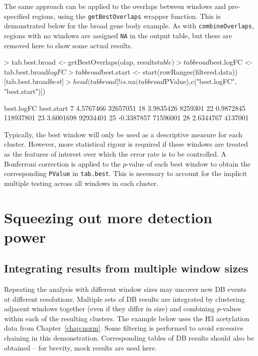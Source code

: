 \documentclass[12pt]{report}
\renewenvironment{Schunk}{\vspace{0pt}}{\vspace{0pt}}
\newcommand{\code}[1]{{\small\texttt{#1}}}
\begin{document}
The same approach can be applied to the overlaps between windows and pre-specified regions, using the \code{getBestOverlaps} wrapper function.
This is demonstrated below for the broad gene body example.
As with \code{combineOverlaps}, regions with no windows are assigned \code{NA} in the output table, but these are removed here to show some actual results.

\begin{Schunk}
\begin{Sinput}
> tab.best.broad <- getBestOverlaps(olap, results$table)
> tabbroad$best.logFC <- tab.best.broad$logFC
> tabbroad$best.start <- start(rowRanges(filtered.data))[tab.best.broad$best]
> head(tabbroad[!is.na(tabbroad$PValue),c("best.logFC", "best.start")])
\end{Sinput}
\begin{Soutput}
   best.logFC best.start
7   4.5767466   32657051
18  3.9835426    8259301
22  0.9872845  118937801
23  3.6001698   92934401
25 -0.3387857   71596001
28  2.6344767    4137001
\end{Soutput}
\end{Schunk}

Typically, the best window will only be used as a descriptive measure for each cluster.
However, more statistical rigour is required if these windows are treated as the features of interest over which the error rate is to be controlled.
A Bonferroni correction is applied to the $p$-value of each best window to obtain the corresponding \code{PValue} in \code{tab.best}.
This is necessary to account for the implicit multiple testing across all windows in each cluster.

\section{Squeezing out more detection power}

\subsection{Integrating results from multiple window sizes}
\label{sec:bin_integrate}
Repeating the analysis with different window sizes may uncover new DB events at different resolutions.
Multiple sets of DB results are integrated by clustering adjacent windows together (even if they differ in size) and combining $p$-values within each of the resulting clusters.
The example below uses the H3 acetylation data from Chapter~\ref{chap:norm}.
Some filtering is performed to avoid excessive chaining in this demonstration.
Corresponding tables of DB results should also be obtained -- for brevity, mock results are used here.
\end{document}
